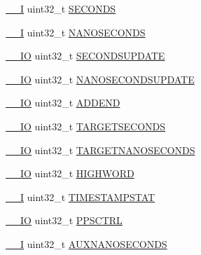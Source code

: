 \begin{DoxyCompactItemize}
\hyperlink{core__sc300_8h_af63697ed9952cc71e1225efe205f6cd3}{\+\_\+\+\_\+I} uint32\+\_\+t \hyperlink{struct_l_p_c___e_n_e_t___t_a72b28832b2272832e0ff8cfca60fe9f5}{S\+E\+C\+O\+N\+DS}
\item 
\hyperlink{core__sc300_8h_af63697ed9952cc71e1225efe205f6cd3}{\+\_\+\+\_\+I} uint32\+\_\+t \hyperlink{struct_l_p_c___e_n_e_t___t_a2d0cb669d0a3020167b992cef2fcab48}{N\+A\+N\+O\+S\+E\+C\+O\+N\+DS}
\item 
\hyperlink{core__sc300_8h_aec43007d9998a0a0e01faede4133d6be}{\+\_\+\+\_\+\+IO} uint32\+\_\+t \hyperlink{struct_l_p_c___e_n_e_t___t_a61dbfd6fa5c5c6cc94317bc5c8436dae}{S\+E\+C\+O\+N\+D\+S\+U\+P\+D\+A\+TE}
\item 
\hyperlink{core__sc300_8h_aec43007d9998a0a0e01faede4133d6be}{\+\_\+\+\_\+\+IO} uint32\+\_\+t \hyperlink{struct_l_p_c___e_n_e_t___t_a1521ff2c6e7dfe97cf8159eaa5d3f103}{N\+A\+N\+O\+S\+E\+C\+O\+N\+D\+S\+U\+P\+D\+A\+TE}
\item 
\hyperlink{core__sc300_8h_aec43007d9998a0a0e01faede4133d6be}{\+\_\+\+\_\+\+IO} uint32\+\_\+t \hyperlink{struct_l_p_c___e_n_e_t___t_ae107a92b0d9c6b4c0fae7a96ba13b81f}{A\+D\+D\+E\+ND}
\item 
\hyperlink{core__sc300_8h_aec43007d9998a0a0e01faede4133d6be}{\+\_\+\+\_\+\+IO} uint32\+\_\+t \hyperlink{struct_l_p_c___e_n_e_t___t_a22e1e0b41642bcae8d9386224f72bbec}{T\+A\+R\+G\+E\+T\+S\+E\+C\+O\+N\+DS}
\item 
\hyperlink{core__sc300_8h_aec43007d9998a0a0e01faede4133d6be}{\+\_\+\+\_\+\+IO} uint32\+\_\+t \hyperlink{struct_l_p_c___e_n_e_t___t_aa4080f8d9c536e65d211da07f9cb324f}{T\+A\+R\+G\+E\+T\+N\+A\+N\+O\+S\+E\+C\+O\+N\+DS}
\item 
\hyperlink{core__sc300_8h_aec43007d9998a0a0e01faede4133d6be}{\+\_\+\+\_\+\+IO} uint32\+\_\+t \hyperlink{struct_l_p_c___e_n_e_t___t_acc3fe3644a02716e7cf076ed0965d916}{H\+I\+G\+H\+W\+O\+RD}
\item 
\hyperlink{core__sc300_8h_af63697ed9952cc71e1225efe205f6cd3}{\+\_\+\+\_\+I} uint32\+\_\+t \hyperlink{struct_l_p_c___e_n_e_t___t_aac72e693e97565deecfab049c7151edf}{T\+I\+M\+E\+S\+T\+A\+M\+P\+S\+T\+AT}
\item 
\hyperlink{core__sc300_8h_aec43007d9998a0a0e01faede4133d6be}{\+\_\+\+\_\+\+IO} uint32\+\_\+t \hyperlink{struct_l_p_c___e_n_e_t___t_abe830099183c82e16da56a048a2f9ac2}{P\+P\+S\+C\+T\+RL}
\item 
\hyperlink{core__sc300_8h_af63697ed9952cc71e1225efe205f6cd3}{\+\_\+\+\_\+I} uint32\+\_\+t \hyperlink{struct_l_p_c___e_n_e_t___t_af8c9c3c59f01af31ae421be71126105d}{A\+U\+X\+N\+A\+N\+O\+S\+E\+C\+O\+N\+DS}

\end{DoxyCompactItemize}
